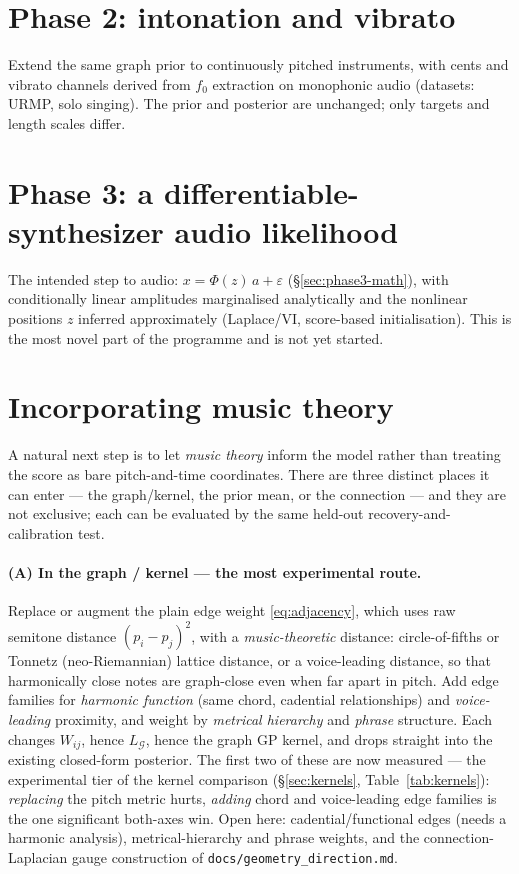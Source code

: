 \documentclass[11pt,a4paper]{report}
\newcommand{\graph}{\mathcal{G}}
\newcommand{\Lg}{L_{\graph}}
\begin{document}
\section{Phase 2: intonation and vibrato}
Extend the same graph prior to continuously pitched instruments, with cents and
vibrato channels derived from $f_0$ extraction on monophonic audio (datasets: URMP,
solo singing). The prior and posterior are unchanged; only targets and length scales
differ.

\section{Phase 3: a differentiable-synthesizer audio likelihood}
The intended step to audio: $x = \Phi(z)\,a + \varepsilon$
(\S\ref{sec:phase3-math}), with conditionally linear amplitudes marginalised
analytically and the nonlinear positions $z$ inferred approximately (Laplace/VI,
score-based initialisation). This is the most novel part of the programme and is not
yet started.

\section{Incorporating music theory}\label{sec:musictheory}
A natural next step is to let \emph{music theory} inform the model rather than treating
the score as bare pitch-and-time coordinates. There are three distinct places it can
enter --- the graph/kernel, the prior mean, or the connection --- and they are not
exclusive; each can be evaluated by the same held-out recovery-and-calibration test.

\paragraph{(A) In the graph / kernel --- the most experimental route.}
Replace or augment the plain edge weight \eqref{eq:adjacency}, which uses raw semitone
distance $(p_i - p_j)^2$, with a \emph{music-theoretic} distance: circle-of-fifths or
Tonnetz (neo-Riemannian) lattice distance, or a voice-leading distance, so that
harmonically close notes are graph-close even when far apart in pitch. Add edge
families for \emph{harmonic function} (same chord, cadential relationships) and
\emph{voice-leading} proximity, and weight by \emph{metrical hierarchy} and
\emph{phrase} structure. Each changes $W_{ij}$, hence $\Lg$, hence the graph GP kernel,
and drops straight into the existing closed-form posterior. The first two of these are
now measured --- the experimental tier of the kernel comparison (\S\ref{sec:kernels},
Table~\ref{tab:kernels}): \emph{replacing} the pitch metric hurts, \emph{adding} chord
and voice-leading edge families is the one significant both-axes win. Open here:
cadential/functional edges (needs a harmonic analysis), metrical-hierarchy and phrase
weights, and the connection-Laplacian gauge construction of
\texttt{docs/geometry\_direction.md}.
\end{document}

